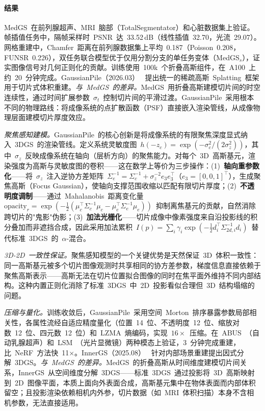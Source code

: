 \paragraph{结果}
MedGS~在前列腺超声、MRI~脑部（TotalSegmentator）和心脏数据集上验证。帧插值任务中，隔帧采样时~PSNR~达~33.52\,dB（线性插值~32.70，光流~29.07）。网格重建中，Chamfer~距离在前列腺数据集上平均~0.187（Poisson~0.208，FUNSR~0.226），双任务联合模型优于仅用分割分支的单任务变体（MedGS$_s$），证实图像信号对几何正则化的贡献。训练使用~100k~个折叠高斯组件，在~A100~上约~20~分钟完成。GaussianPile（2026.03）~\cite{2603_20611} 提出统一的稀疏高斯~Splatting~框架用于切片式体积重建。\textit{与~MedGS~的差异。}MedGS~用折叠高斯建模切片间的时空连续性，通过时间扩展参数~$\sigma_t$~控制切片间的平滑过渡。GaussianPile~采用根本不同的物理路线：将成像系统的点扩散函数（PSF）直接嵌入渲染管线，从成像物理层面建模切片厚度效应。

\textit{聚焦感知建模。}GaussianPile~的核心创新是将成像系统的有限聚焦深度显式纳入~3DGS~的渲染管线。定义系统灵敏度图~$h(-z_c) = \exp(-\sigma_c^2/(2\sigma_z^2))$，其中~$\sigma_z$~反映成像系统在轴向（层析方向）的聚焦能力。对每个~3D~高斯基元，渲染强度为高斯与灵敏度图的卷积——这在数学上等价为三步操作：(1)~\textbf{轴向重参数化}——将~$\sigma_z$~注入逆协方差矩阵~$\Sigma_e^{-1} = \Sigma_c^{-1} + \sigma_z^{-2}e_3e_3^\top$（$e_3 = [0,0,1]^\top$），生成聚焦高斯（Focus Gaussian），使轴向支撑范围收缩以匹配有限切片厚度；(2)~\textbf{不透明度调制}——通过~Mahalanobis~距离变化量~$\text{opacity}_r = \exp(-\frac{1}{2}(\mu_c^\top\Sigma_c^{-1}\mu_c - \mu_e^\top\Sigma_e^{-1}\mu_e))$~抑制离焦基元的贡献，自然消除跨切片的"鬼影"伪影；(3)~\textbf{加法光栅化}——切片成像中像素强度来自沿投影线的积分叠加而非遮挡合成，因此采用加法累积~$I(p) = \sum_{i} \gamma_i \exp(-\frac{1}{2}d_i^\top\Sigma_{2d,i}^{-1}d_i)$~替代标准~3DGS~的~$\alpha$-混合。

\textit{3D-2D~一致性保证。}聚焦感知模型的一个关键优势是天然保证~3D~体积一致性：同一高斯基元被多个切片图像观测时共享相同的协方差参数，梯度信息直接依赖于聚焦高斯表示——高斯无法在切片位置拟合图像的同时在焦平面外维持不同内部结构。这种内置正则化消除了标准~3DGS~中~2D~投影看似合理但~3D~结构塌缩的问题。

\textit{压缩与量化。}训练收敛后，GaussianPile~采用空间~Morton~排序暴露参数局部相关性，各属性流经自适应精度量化（位置~14~位、不透明度~12~位、缩放对数~12~位、四元数~12~位）和~LZMA~熵编码，实现~$16\times$~压缩。在~ABUS~（自动乳腺超声）和~LSM~（光片显微镜）两种模态上验证，3~分钟完成重建，比~NeRF~方法快~11$\times$。InnerGS（2025.08）~\cite{2508_13287} 针对内部场景重建提出因式分解~3DGS。\textit{与~MedGS~的差异。}MedGS~的折叠高斯从时间维度建模切片间关系，InnerGS~从空间维度分解~3DGS——标准~3DGS~通过投影将~3D~高斯映射到~2D~图像平面，本质上面向外表面合成，高斯基元集中在物体表面而内部体积留空；且投影渲染依赖相机内外参，切片数据（如~MRI~体积扫描）本身不含相机参数，无法直接适用。


